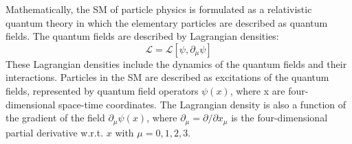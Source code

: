 
Mathematically, the SM of particle physics is formulated as a relativistic quantum theory in which the elementary particles are described as quantum fields. The quantum fields are described by Lagrangian densities:
\begin{equation}
    \mathscr{L} = \mathscr{L}[\psi, \partial_\mu\psi]
\end{equation}
These Lagrangian densities include the dynamics of the quantum fields and their interactions. Particles in the SM are described as excitations of the quantum fields, represented by quantum field operators $\psi(x)$, where x are four-dimensional space-time coordinates. The Lagrangian density is also a function of the gradient of the field $\partial_\mu\psi(x)$, where $\partial_\mu = \partial/\partial x_\mu$ is the four-dimensional partial derivative w.r.t. $x$ with $\mu = 0, 1, 2, 3 $.

